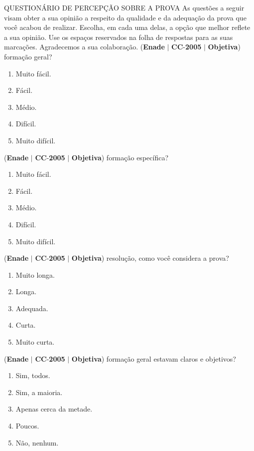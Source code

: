 \documentclass{exam}
\begin{document}
\begin{questions}
QUESTIONÁRIO DE PERCEPÇÃO SOBRE A PROVA
As questões a seguir visam obter a sua opinião a respeito da qualidade e da adequação da prova que você acabou
de realizar. Escolha, em cada uma delas, a opção que melhor reflete a sua opinião. Use os espaços reservados na folha
de respostas para as suas marcações.
Agradecemos a sua colaboração.
\question (\textbf{Enade} $|$ \textbf{CC}-\textbf{2005} $|$ \textbf{Objetiva})
formação geral?
	\begin{enumerate}[label=\alph*)]
		\item  Muito fácil.
		\item  Fácil.
		\item  Médio.
		\item  Difícil.
		\item  Muito difícil.
	\end{enumerate}

\question (\textbf{Enade} $|$ \textbf{CC}-\textbf{2005} $|$ \textbf{Objetiva})
formação específica?
	\begin{enumerate}[label=\alph*)]
		\item  Muito fácil.
		\item  Fácil.
		\item  Médio.
		\item  Difícil.
		\item  Muito difícil.
	\end{enumerate}

\question (\textbf{Enade} $|$ \textbf{CC}-\textbf{2005} $|$ \textbf{Objetiva})
resolução, como você considera a prova?
	\begin{enumerate}[label=\alph*)]
		\item  Muito longa.
		\item  Longa.
		\item  Adequada.
		\item  Curta.
		\item  Muito curta.
	\end{enumerate}

\question (\textbf{Enade} $|$ \textbf{CC}-\textbf{2005} $|$ \textbf{Objetiva})
formação geral estavam claros e objetivos?
	\begin{enumerate}[label=\alph*)]
		\item  Sim, todos.
		\item  Sim, a maioria.
		\item  Apenas cerca da metade.
		\item  Poucos.
		\item  Não, nenhum.
	\end{enumerate}


\end{questions}
\end{document}
